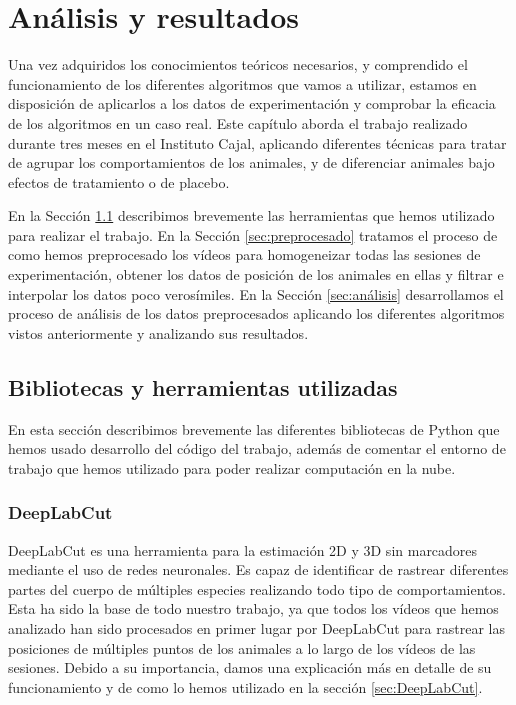 \chapter{Análisis y resultados}
\label{chap:analisis-y-resultados}

Una vez adquiridos los conocimientos teóricos necesarios, y comprendido el funcionamiento de los diferentes algoritmos que vamos a utilizar, estamos en disposición de aplicarlos a los datos de experimentación y comprobar la eficacia de los algoritmos en un caso real. Este capítulo aborda el trabajo realizado durante tres meses en el Instituto Cajal, aplicando diferentes técnicas para tratar de agrupar los comportamientos de los animales, y de diferenciar animales bajo efectos de tratamiento o de placebo.

En la Sección \ref{sec:herramientas} describimos brevemente las herramientas que hemos utilizado para realizar el trabajo. En la Sección \ref{sec:preprocesado} tratamos el proceso de como hemos preprocesado los vídeos para homogeneizar todas las sesiones de experimentación, obtener los datos de posición de los animales en ellas y filtrar e interpolar los datos poco verosímiles. En la Sección \ref{sec:análisis} desarrollamos el proceso de análisis de los datos preprocesados aplicando los diferentes algoritmos vistos anteriormente y analizando sus resultados.

\section{Bibliotecas y herramientas utilizadas} \label{sec:herramientas}
En esta sección describimos brevemente las diferentes bibliotecas de Python que hemos usado desarrollo del código del trabajo, además de comentar el entorno de trabajo que hemos utilizado para poder realizar computación en la nube.
\subsection*{DeepLabCut}
DeepLabCut \cite{deeplabcut} es una herramienta para la estimación 2D y 3D sin marcadores mediante el uso de redes neuronales. Es capaz de identificar de rastrear diferentes partes del cuerpo de múltiples especies realizando todo tipo de comportamientos. Esta ha sido la base de todo nuestro trabajo, ya que todos los vídeos que hemos analizado han sido procesados en primer lugar por DeepLabCut para rastrear las posiciones de múltiples puntos de los animales a lo largo de los vídeos de las sesiones. Debido a su importancia, damos una explicación más en detalle de su funcionamiento y de como lo hemos utilizado en la sección \ref{sec:DeepLabCut}.


